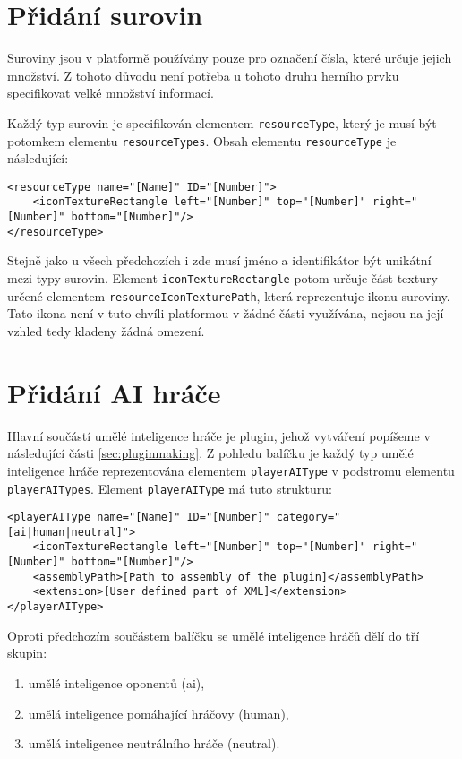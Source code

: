\section{Přidání surovin}
Suroviny jsou v platformě používány pouze pro označení čísla, které určuje jejich množství. Z tohoto důvodu není potřeba u tohoto druhu herního prvku specifikovat velké množství informací.

Každý typ surovin je specifikován elementem \texttt{resourceType}, který je musí být potomkem elementu \texttt{resourceTypes}. Obsah elementu \texttt{resourceType} je následující:
\begin{lstlisting}
<resourceType name="[Name]" ID="[Number]">
	<iconTextureRectangle left="[Number]" top="[Number]" right="[Number]" bottom="[Number]"/>
</resourceType>
\end{lstlisting}

Stejně jako u všech předchozích i zde musí jméno a identifikátor být unikátní mezi typy surovin. Element \texttt{iconTextureRectangle} potom určuje část textury určené elementem \texttt{resourceIconTexturePath}, která reprezentuje ikonu suroviny. Tato ikona není v tuto chvíli platformou v žádné části využívána, nejsou na její vzhled tedy kladeny žádná omezení.
\section{Přidání AI hráče}
Hlavní součástí umělé inteligence hráče je plugin, jehož vytváření popíšeme v následující části \ref{sec:pluginmaking}. Z pohledu balíčku je každý typ umělé inteligence hráče reprezentována elementem \texttt{playerAIType} v podstromu elementu \texttt{playerAITypes}. Element \texttt{playerAIType} má tuto strukturu:

\begin{lstlisting}
<playerAIType name="[Name]" ID="[Number]" category="[ai|human|neutral]">
	<iconTextureRectangle left="[Number]" top="[Number]" right="[Number]" bottom="[Number]"/>
	<assemblyPath>[Path to assembly of the plugin]</assemblyPath>
	<extension>[User defined part of XML]</extension>
</playerAIType>
\end{lstlisting}

Oproti předchozím součástem balíčku se umělé inteligence hráčů dělí do tří skupin:
\begin{enumerate}
	\item umělé inteligence oponentů (ai),
	\item umělá inteligence pomáhající hráčovy (human),
	\item umělá inteligence neutrálního hráče (neutral).
\end{enumerate}

